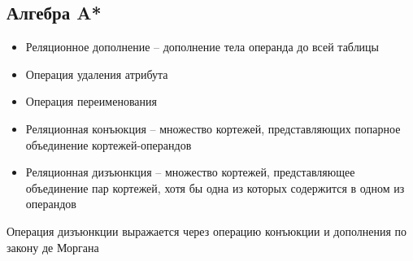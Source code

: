 \documentclass[11pt]{article}
\begin{document}
\subsection{Алгебра A*}
\label{sec:orga9146fe}
\begin{itemize}
\item Реляционное дополнение -- дополнение тела операнда до всей таблицы
\item Операция удаления атрибута
\item Операция переименования
\item Реляционная конъюкция -- множество кортежей, представляющих попарное объединение кортежей-операндов
\item Реляционная дизъюнкция -- множество кортежей, представляющее объединение пар кортежей, хотя бы одна из которых содержится в одном из операндов
\end{itemize}
Операция дизъюнкции выражается через операцию конъюкции и дополнения по закону де Моргана
\end{document}
